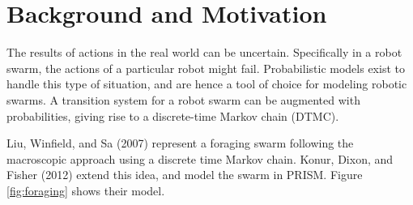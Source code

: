 \documentclass[11pt]{article}
\theoremstyle{definition}
\begin{document}
\section{Background and Motivation}
\label{sec:background-motivation}

The results of actions in the real world can be uncertain.
Specifically in a robot swarm, the actions of a particular robot might fail.
Probabilistic models exist to handle this type of situation, and are hence a
tool of choice for modeling robotic swarms.
A transition system for a robot swarm can be augmented with probabilities,
giving rise to a discrete-time Markov chain (DTMC).

Liu, Winfield, and Sa (2007) represent a foraging swarm following the
macroscopic approach using a discrete time Markov chain\cite{foraging}.
Konur, Dixon, and Fisher (2012) extend this idea\cite{konur12}, and model the
swarm in PRISM\cite{prism}.
Figure \ref{fig:foraging} shows their model.
\end{document}
